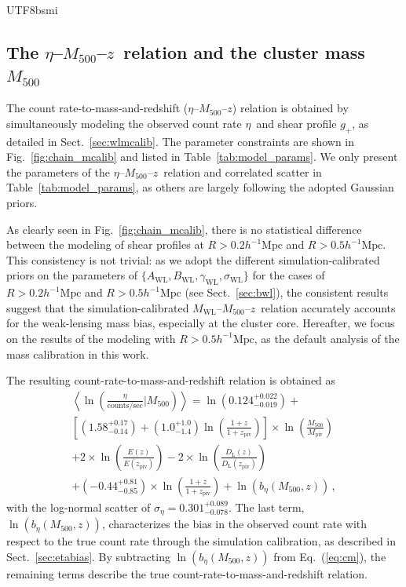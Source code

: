 \documentclass[longauth]{aa}
\newcommand{\Mpch}{\ensuremath{h^{-1}\mathrm{Mpc}}}
\newcommand{\Mfiveoo}{\ensuremath{M_{500}}}
\newcommand{\redshift}{\ensuremath{z}}
\newcommand{\MPIV}{\ensuremath{M_{\mathrm{piv}}}}
\newcommand{\ZPIV}{\ensuremath{z_{\mathrm{piv}}}}
\newcommand{\Ez}{\ensuremath{E(z)}}
\newcommand{\Ezpiv}{\ensuremath{E(z_{\mathrm{piv}})}}
\newcommand{\gshear}{\ensuremath{g_{+}}}
\newcommand{\Mwl}{\ensuremath{M_{\mathrm{WL}}}}
\newcommand{\rate}{\ensuremath{\eta}}
\newcommand{\brate}{\ensuremath{b_{\eta}}}
\newcommand{\sigmaeta}{\ensuremath{\sigma_{\eta}}}
\newcommand{\Awl}{\ensuremath{A_{\mathrm{WL}}}}
\newcommand{\Bwl}{\ensuremath{B_{\mathrm{WL}}}}
\newcommand{\gammawl}{\ensuremath{\gamma_{\mathrm{WL}}}}
\newcommand{\sigmawl}{\ensuremath{\sigma_{\mathrm{WL}}}}
\newcommand{\ansAeta}{\ensuremath{ 0.124^{+0.022}_{-0.019} }}
\newcommand{\ansBeta}{\ensuremath{ 1.58^{+0.17}_{-0.14} }}
\newcommand{\ansdeltaeta}{\ensuremath{ 1.0^{+1.0}_{-1.4} }}
\newcommand{\ansgammaeta}{\ensuremath{ -0.44^{+0.81}_{-0.85} }}
\newcommand{\anssigmaeta}{\ensuremath{ 0.301^{+0.089}_{-0.078} }}
\begin{document}
\begin{CJK*}{UTF8}{bsmi}
\subsection{The \rate--\Mfiveoo--\redshift\ relation and the cluster mass \Mfiveoo}
\label{sec:mass_calibration_results}


The count rate-to-mass-and-redshift (\rate--\Mfiveoo--\redshift) relation is obtained by simultaneously modeling the observed count rate \rate\ and shear profile \gshear, as detailed in Sect.~\ref{sec:wlmcalib}.
The parameter constraints are shown in Fig.~\ref{fig:chain_mcalib} and listed in Table~\ref{tab:model_params}.
We only present the parameters of the \rate--\Mfiveoo--\redshift\ relation and correlated scatter in Table~\ref{tab:model_params}, as others are largely following the adopted Gaussian priors.

As clearly seen in Fig.~\ref{fig:chain_mcalib}, there is no statistical difference between the modeling of shear profiles at $R>0.2\Mpch$ and $R>0.5\Mpch$.
This consistency is not trivial: 
as we adopt the different simulation-calibrated priors on the parameters of $\{\Awl, \Bwl, \gammawl, \sigmawl\}$ 
for the cases of $R>0.2\Mpch$ and $R>0.5\Mpch$ (see Sect.~\ref{sec:bwl}),
the consistent results suggest that the simulation-calibrated \Mwl--\Mfiveoo--\redshift\ relation accurately accounts for the weak-lensing mass bias, especially at the cluster core.
Hereafter, we focus on the results of the modeling with $R>0.5\Mpch$, as the default analysis of the mass calibration in this work.


The resulting count-rate-to-mass-and-redshift relation is obtained as
%
\begin{multline}
\label{eq:cm}
\left\langle\ln\left( \frac{\rate}{ \mathrm{counts}/\mathrm{sec} } \Bigg|\Mfiveoo \right)\right\rangle 
= \ln \left( \ansAeta \right) + \\
\left[ \left( \ansBeta \right) + \left( \ansdeltaeta \right) \ln\left(\frac{1 + \redshift}{1 + \ZPIV}\right) \right] \times
\ln\left(\frac{\Mfiveoo}{\MPIV}\right) \\
+ 2 \times \ln\left(\frac{\Ez}{\Ezpiv}\right)
-2\times\ln\left(\frac{D_{\mathrm{L}}\left(\redshift\right)}{D_{\mathrm{L}}\left(\ZPIV\right)}\right) \\
+ \left( \ansgammaeta \right) \times 
\ln \left(\frac{1 + \redshift}{1 + \ZPIV}\right)
+ \ln\left( \brate(\Mfiveoo, \redshift) \right)
\, ,
\end{multline}
%
with the log-normal scatter of $\sigmaeta = \anssigmaeta$.
The last term, $\ln\left( \brate(\Mfiveoo, \redshift) \right)$, characterizes the bias in the observed count rate with respect to the true count rate through the simulation calibration, as described in Sect.~\ref{sec:etabias}.
By subtracting $\ln\left( \brate(\Mfiveoo, \redshift) \right)$ from Eq.~(\ref{eq:cm}), the remaining terms describe the true count-rate-to-mass-and-redshift relation.




\end{CJK*}
\end{document}
